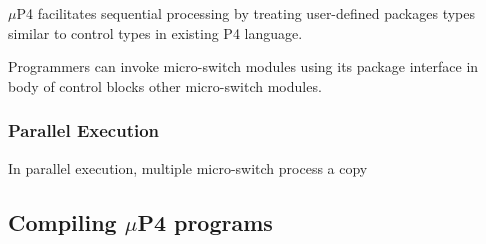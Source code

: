 $\mu$P4 facilitates sequential processing by treating user-defined packages types similar to control types in existing P4 language.

Programmers can invoke micro-switch modules using its package interface in body of control blocks other micro-switch modules.


\subsubsection{Parallel Execution}
In parallel execution, multiple micro-switch process a copy 

\subsection{Compiling $\mu$P4 programs}











% 
% 
% 
% 
% 




